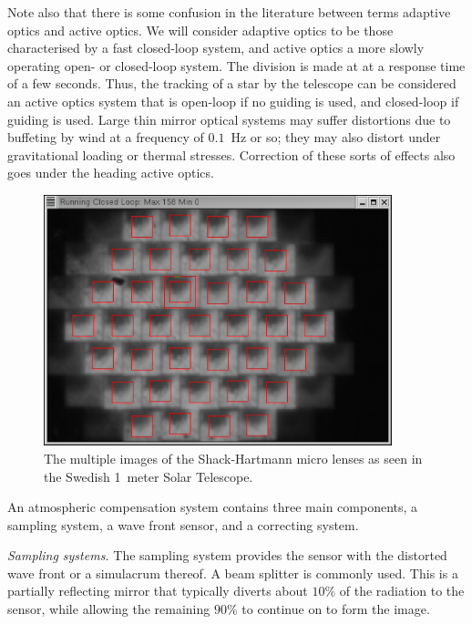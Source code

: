 Note also that there is some confusion in the literature between terms 
adaptive optics and active optics. We will consider adaptive optics to
be those characterised by a fast closed-loop system, and active optics 
a more slowly operating open- or closed-loop system. The division is made
at at a response time of a few seconds. Thus, the tracking of a star by 
the telescope can be considered an active optics system that is open-loop 
if no guiding is used, and closed-loop if guiding is used. Large thin mirror
optical systems may suffer distortions due to buffeting by wind at a 
frequency of $0.1$~Hz or so; they may also distort under gravitational loading
or thermal stresses. Correction of these sorts of effects also goes under
the heading active optics. 

\begin{figure}[h]
	\centering
	\includegraphics[width=0.9\textwidth]{AO_live_display.eps}
  \caption{The multiple images of the Shack-Hartmann micro lenses as seen 
in the Swedish 1~meter Solar Telescope.}
  \label{fig:ao_live_display}
\end{figure}

An atmospheric compensation system contains three main components, a
sampling system, a wave front sensor, and a correcting system.

\noindent
{\it Sampling systems.} The sampling system provides the sensor with the 
distorted wave front or a simulacrum thereof. A beam splitter is commonly used.
This is a partially reflecting mirror that typically diverts about 
$10\%$ of the radiation to the sensor, while allowing the remaining $90\%$
 to continue on to form the image. 


